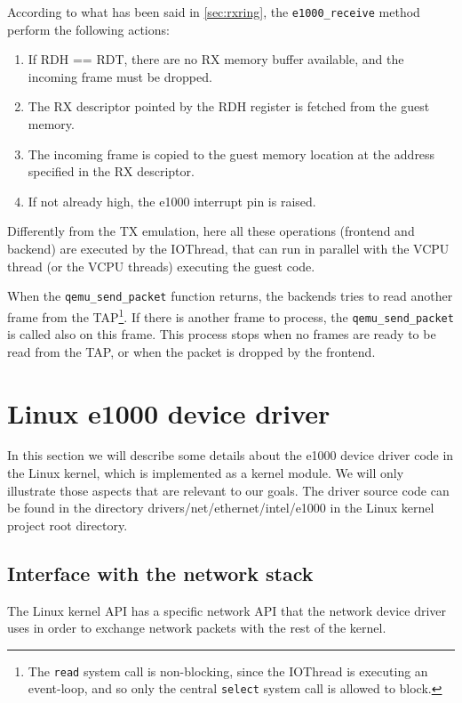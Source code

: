 According to what has been said in \ref{sec:rxring}, the \texttt{e1000\_receive} method perform the following actions:
\begin{enumerate}
    \item If RDH == RDT, there are no RX memory buffer available, and the incoming frame must be dropped.
    \item The RX descriptor pointed by the RDH register is fetched from the guest memory.
    \item The incoming frame is copied to the guest memory location at the address specified in the RX descriptor.
    \item If not already high, the e1000 interrupt pin is raised.
\end{enumerate}

Differently from the TX emulation, here all these operations (frontend and backend) are executed by the IOThread, that can run in parallel
with the VCPU thread (or the VCPU threads) executing the guest code.

\vspace{0.5cm}

When the \texttt{qemu\_send\_packet} function returns, the backends tries to read another frame from the TAP\footnote{The \texttt{read}
system call is non-blocking, since the IOThread is executing an event-loop, and so only the central \texttt{select} system call is
allowed to block.}. If there is another frame to process, the \texttt{qemu\_send\_packet} is called also on this frame.
This process stops when no frames are ready to be read from the TAP, or when the packet is dropped by the frontend.



\section{Linux e1000 device driver}
\label{sec:e1000driver}
In this section we will describe some details about the e1000 device driver code in the Linux kernel, which is implemented as
a kernel module.
We will only illustrate those aspects that are relevant to our goals.
The driver source code can be found in the directory drivers/net/ethernet/intel/e1000 in the Linux kernel project root directory.

\subsection{Interface with the network stack}
\label{sec:netapi}
The Linux kernel API has a specific network API that the network device driver uses in order to exchange network packets with
the rest of the kernel.

